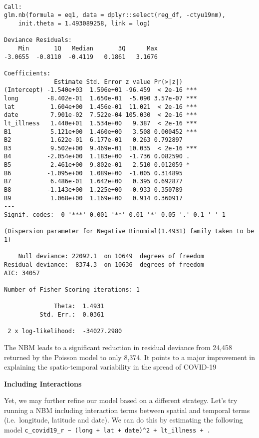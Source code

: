 \documentclass[
  letterpaper,
  krantz2]{style/krantz}
\begin{document}
\begin{verbatim}

Call:
glm.nb(formula = eq1, data = dplyr::select(reg_df, -ctyu19nm), 
    init.theta = 1.493089258, link = log)

Deviance Residuals: 
    Min       1Q   Median       3Q      Max  
-3.0655  -0.8110  -0.4119   0.1861   3.1676  

Coefficients:
              Estimate Std. Error z value Pr(>|z|)    
(Intercept) -1.540e+03  1.596e+01 -96.459  < 2e-16 ***
long        -8.402e-01  1.650e-01  -5.090 3.57e-07 ***
lat          1.604e+00  1.456e-01  11.021  < 2e-16 ***
date         7.901e-02  7.522e-04 105.030  < 2e-16 ***
lt_illness   1.440e+01  1.534e+00   9.387  < 2e-16 ***
B1           5.121e+00  1.460e+00   3.508 0.000452 ***
B2           1.622e-01  6.177e-01   0.263 0.792897    
B3           9.502e+00  9.469e-01  10.035  < 2e-16 ***
B4          -2.054e+00  1.183e+00  -1.736 0.082590 .  
B5           2.461e+00  9.802e-01   2.510 0.012059 *  
B6          -1.095e+00  1.089e+00  -1.005 0.314895    
B7           6.486e-01  1.642e+00   0.395 0.692877    
B8          -1.143e+00  1.225e+00  -0.933 0.350789    
B9           1.068e+00  1.169e+00   0.914 0.360917    
---
Signif. codes:  0 '***' 0.001 '**' 0.01 '*' 0.05 '.' 0.1 ' ' 1

(Dispersion parameter for Negative Binomial(1.4931) family taken to be 1)

    Null deviance: 22092.1  on 10649  degrees of freedom
Residual deviance:  8374.3  on 10636  degrees of freedom
AIC: 34057

Number of Fisher Scoring iterations: 1

              Theta:  1.4931 
          Std. Err.:  0.0361 

 2 x log-likelihood:  -34027.2980 
\end{verbatim}

The NBM leads to a significant reduction in residual deviance from
24,458 returned by the Poisson model to only 8,374. It points to a major
improvement in explaining the spatio-temporal variability in the spread
of COVID-19

\textbf{Including Interactions}

Yet, we may further refine our model based on a different strategy.
Let's try running a NBM including interaction terms between spatial and
temporal terms (i.e.~longitude, latitude and date). We can do this by
estimating the following model
\texttt{c\_covid19\_r\ \textasciitilde{}\ (long\ +\ lat\ +\ date)\^{}2\ +\ lt\_illness\ +\ .}
\end{document}
